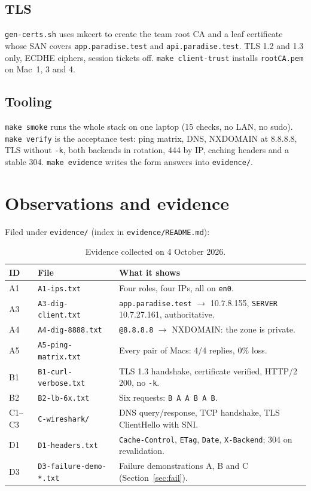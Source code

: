 \documentclass[11pt,a4paper]{article}
\begin{document}
\subsection{TLS}
\texttt{gen-certs.sh} uses mkcert to create the team root CA and a leaf certificate whose SAN covers
\texttt{app.paradise.test} and \texttt{api.paradise.test}. TLS 1.2 and 1.3 only, ECDHE ciphers,
session tickets off. \texttt{make client-trust} installs \texttt{rootCA.pem} on Mac~1, 3 and 4.

\subsection{Tooling}
\texttt{make smoke} runs the whole stack on one laptop (15 checks, no LAN, no sudo).
\texttt{make verify} is the acceptance test: ping matrix, DNS, NXDOMAIN at 8.8.8.8, TLS without
\texttt{-k}, both backends in rotation, 444 by IP, caching headers and a stable 304.
\texttt{make evidence} writes the form answers into \texttt{evidence/}.

\section{Observations and evidence}
Filed under \texttt{evidence/} (index in \texttt{evidence/README.md}):

\begin{table}[!htbp]
\centering
\caption{Evidence collected on 4 October 2026.}
{\small
\begin{tabular}{@{}L{1.0cm}L{4.2cm}L{9.4cm}@{}}
\toprule
\textbf{ID} & \textbf{File} & \textbf{What it shows} \\
\midrule
A1 & \texttt{A1-ips.txt} & Four roles, four IPs, all on \texttt{en0}. \\
A3 & \texttt{A3-dig-client.txt} & \texttt{app.paradise.test} $\to$ 10.7.8.155, \texttt{SERVER} 10.7.27.161, authoritative. \\
A4 & \texttt{A4-dig-8888.txt} & \texttt{@8.8.8.8} $\to$ NXDOMAIN: the zone is private. \\
A5 & \texttt{A5-ping-matrix.txt} & Every pair of Macs: 4/4 replies, 0\% loss. \\
B1 & \texttt{B1-curl-verbose.txt} & TLS 1.3 handshake, certificate verified, HTTP/2 200, no \texttt{-k}. \\
B2 & \texttt{B2-lb-6x.txt} & Six requests: \texttt{B A A B A B}. \\
C1--C3 & \texttt{C-wireshark/} & DNS query/response, TCP handshake, TLS ClientHello with SNI. \\
D1 & \texttt{D1-headers.txt} & \texttt{Cache-Control}, \texttt{ETag}, \texttt{Date}, \texttt{X-Backend}; 304 on revalidation. \\
D3 & \texttt{D3-failure-demo-*.txt} & Failure demonstrations A, B and C (Section~\ref{sec:fail}). \\
\bottomrule
\end{tabular}}
\end{table}
\end{document}
